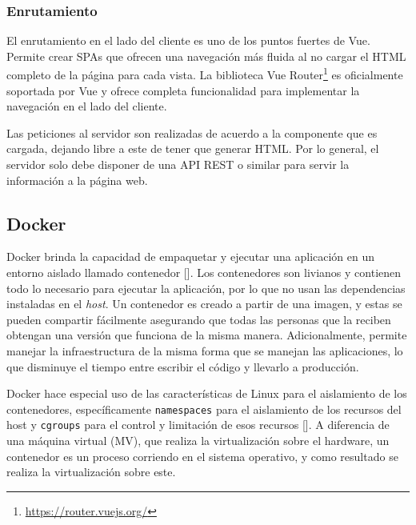 \subsubsection{Enrutamiento} 

El enrutamiento en el lado del cliente es uno de los puntos fuertes de Vue. Permite crear SPAs que ofrecen una navegación más fluida al no cargar el HTML completo de la página para cada vista. La biblioteca Vue Router\footnote{\url{https://router.vuejs.org/}} es oficialmente soportada por Vue y ofrece completa funcionalidad para implementar la navegación en el lado del cliente.

Las peticiones al servidor son realizadas de acuerdo a la componente que es cargada, dejando libre a este de tener que generar HTML. Por lo general, el servidor solo debe disponer de una API REST o similar para servir la información a la página web.

\subsection{Docker}\label{sec:docker}

Docker brinda la capacidad de empaquetar y ejecutar una aplicación en un entorno aislado llamado contenedor [\cite{docker-docs}]. Los contenedores son livianos y contienen todo lo necesario para ejecutar la aplicación, por lo que no usan las dependencias instaladas en el \textit{host}. Un contenedor es creado a partir de una imagen, y estas se pueden compartir fácilmente asegurando que todas las personas que la reciben obtengan una versión que funciona de la misma manera. Adicionalmente, permite manejar la infraestructura de la misma forma que se manejan las aplicaciones, lo que disminuye el tiempo entre escribir el código y llevarlo a producción.

Docker hace especial uso de las características de Linux para el aislamiento de los contenedores, específicamente \verb|namespaces| para el aislamiento de los recursos del host y \verb|cgroups| para el control y limitación de esos recursos [\cite{cg-and-ns-docker}]. A diferencia de una máquina virtual (MV), que realiza la virtualización sobre el hardware, un contenedor es un proceso corriendo en el sistema operativo, y como resultado se realiza la virtualización sobre este.

